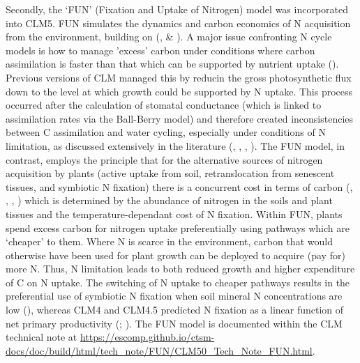 \documentclass[draft,linenumbers]{agujournal}
\begin{document}
Secondly, the `FUN' (Fixation and Uptake of Nitrogen) model was incorporated into CLM5. FUN simulates the dynamics and carbon economics of N acquisition from the environment, building on (\cite{fisher2010fun}, \cite{brzostek2014} \& \cite{shi2016}). A major issue confronting N cycle models is how to manage 'excess' carbon under conditions where carbon assimilation is faster than that which can be supported by nutrient uptake (\cite{dekauwe2014}). Previous versions of CLM managed this by reducin the gross photosynthetic flux down to the level at which growth could be supported by N uptake. This process occurred after the calculation of stomatal conductance (which is linked to assimilation rates via the Ball-Berry model) and therefore created inconsistencies between C assimilation and water cycling, especially under conditions of N limitation, as discussed extensively in the literature (\cite{medlyn2011}, \cite{bonan2012}, \cite{dekauwe2014}, \cite{walker2014}). The FUN model, in contrast, employs the principle that for the alternative sources of nitrogen acquisition by plants (active uptake from soil, retranslocation from senescent tissues, and symbiotic N fixation) there is a concurrent cost in terms of carbon (\cite{bloom1985}, \cite{rastetter2001},  \cite{jiang2017}, \cite{terrer2018}) which is determined by the abundance of nitrogen in the soils and plant tissues and the temperature-dependant cost of N fixation. Within FUN, plants spend excess carbon for nitrogen uptake preferentially using pathways which are `cheaper' to them. Where N is scarce in the environment, carbon that would otherwise have been used for plant growth can be deployed to acquire (pay for) more N. Thus, N limitation leads to both reduced growth and higher expenditure of C on N uptake.   The switching of N uptake to cheaper pathways results in the preferential use of symbiotic N fixation when soil mineral N concentrations are low (\cite{vitousek2002}), whereas CLM4 and CLM4.5 predicted N fixation as a linear function of net primary productivity (\cite{cleveland1999}; \cite{wieder2015}).   The FUN model is documented within the CLM technical note at \url{https://escomp.github.io/ctsm-docs/doc/build/html/tech_note/FUN/CLM50_Tech_Note_FUN.html}. 
 
\end{document}
